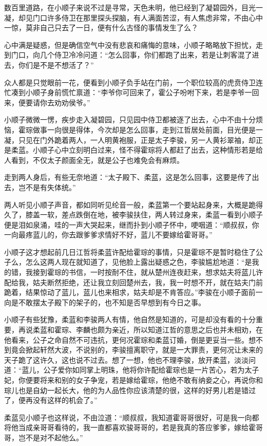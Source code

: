 数百里道路，在小顺子来说不过是寻常，天色未明，他已经到了凝碧园外，目光一凝，却见门口许多侍卫在那里探头探脑，有人满面苦涩，有人焦虑非常，不由心中一惊，莫非自己只去了一日，便有什么古怪的事情发生了么？

心中满是疑惑，但是确信空气中没有悲哀和痛悔的意味，小顺子略略放下担忧，走到门口，向几个侍卫冷冷问道：“怎么回事，你们都跑了出来，若是让刺客混了进去，你们是不是不想活了？”

众人都是只觉眼前一花，便看到小顺子负手站在门前，一个职位较高的虎贲侍卫连忙凑到小顺子身前慌忙禀道：“李爷你可回来了，霍公子吩咐下来，若是李爷一回来，便要请你去劝劝侯爷。”

小顺子微微一愣，疾步走入凝碧园，只见园中侍卫都被逐了出去，心中不由十分烦恼，霍琮做事一向很是得体，今次却是怎么回事，走到江哲居处前面，目光便是一凝，只见在门外跪着两人，一人明黄袍服，正是太子李骏，另一人黄衫翠袖，却正是柔蓝。小顺子心中立刻明白过来，怪不得霍琮将人都赶了出去，这种情形若是给人看到，不仅太子颜面全无，就是公子也难免会有麻烦。

走到两人身后，有些无奈地道：“太子殿下、柔蓝，这是怎么回事，这要是传了出去，岂不是有失体统。”

两人听见小顺子声音，都如同听见纶音一般，柔蓝第一个要站起身来，大概是跪得久了，膝盖一软，差点跌倒在地，被李骏扶住，两人转过身来，柔蓝一看到小顺子便是泪如泉涌，哇的一声大哭起来，继而扑到小顺子怀中，哽咽道：“顺叔叔，你一向最疼蓝儿的，你去跟爹爹求情好不好，蓝儿不要嫁给霍哥哥。”

小顺子这才想起前几日江哲将柔蓝许配给霍琮的事情，只是霍琮不是暂时稳住了公子么，怎么这两人现在就知道了，见他脸上露出疑惑之色，李骏尴尬地道：“是我的错，我接到霍琮的书信，一时按耐不住，就从楚州连夜赶来，想求姑夫将蓝儿许配给我，姑夫断然拒绝，还让我立刻回楚州去，我，我一时想不开，就在姑夫门前跪着，结果惊动了蓝儿，蓝儿也来相求，姑夫却是不肯答应。”李骏在小顺子面前一向是不敢摆太子殿下的架子的，也不知是否早想到有今日之事。

小顺子有些犹豫，柔蓝和李骏两人有情，他自然是知道的，可是却没有看的十分重要，再说柔蓝和霍琮、李麟也颇为亲近，所以知道江哲的意思之后也并未相劝，在他看来，公子之命自然不可违抗，更何况霍琮和柔蓝订婚，倒是更妥当一些。想不到竟会掀起轩然大波，不说别的，李骏擅离职守，就是一大罪责，更何况让未来的天子跪了这许久，这也说不过去。想了一想，他也不理李骏，放开柔蓝，淡淡问道：“蓝儿，公子爱你如同掌上明珠，他将你许配给霍琮也是一片苦心，若为太子妃，你便要将来和别的女子争宠，若是嫁给霍琮，他绝不敢有纳妾之心，再说你和琮儿也是自幼一起长大，他的为人品性你应该清楚的很，这样的好男儿若是错过了，便再没有这样的机会了。”

柔蓝见小顺子也这样说，不由泣道：“顺叔叔，我知道霍哥哥很好，可是我一向都将他当成亲哥哥看待的，我一直都喜欢骏哥哥的，若是我真的答应爹爹，嫁给霍哥哥，岂不是对不起他么。”

